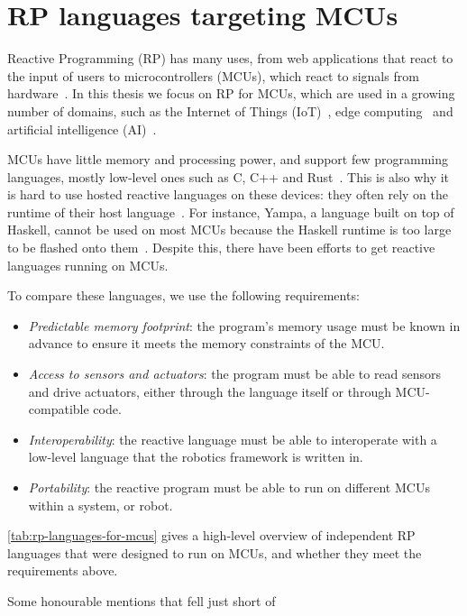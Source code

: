 \documentclass[a4paper]{book}
\begin{document}
\section{RP languages targeting MCUs}
\label{sec:rp-languages-targeting-mcus}
Reactive Programming (RP) has many uses, from web applications that react to the
input of users to microcontrollers (MCUs), which react to signals from
hardware~\cite{surveyRP2024, rpbaremetal2022}. In this thesis we focus on RP for
MCUs, which are used in a growing number of domains, such as the Internet of
Things (IoT)~\cite{gubbi2013internet}, edge computing~\cite{shi2016edge} and
artificial intelligence (AI)~\cite{liu2023space}.
\par
MCUs have little memory and processing power, and support few programming
languages, mostly low-level ones such as C, C++ and Rust~\cite{sharma2024rust}.
This is also why it is hard to use hosted reactive languages on these devices:
they often rely on the runtime of their host language~\cite{surveyRP2024,
oeyen2024virtual}. For instance, Yampa, a language built on top of Haskell,
cannot be used on most MCUs because the Haskell runtime is too large to be
flashed onto them~\cite{sawada2016emfrp}. Despite this, there have been efforts
to get reactive languages running on MCUs.
\par
To compare these languages, we use the following requirements:
\begin{itemize}
    \item \emph{Predictable memory footprint}: the program's memory usage must
        be known in advance to ensure it meets the memory constraints of the
        MCU.
    \item \emph{Access to sensors and actuators}: the program must be able to
        read sensors and drive actuators, either through the language itself or
        through MCU-compatible code.
    \item \emph{Interoperability}: the reactive language must be able to
        interoperate with a low-level language that the robotics framework is
        written in.
    \item \emph{Portability}: the reactive program must be able to run on
        different MCUs within a system, or robot.
\end{itemize}
\cref{tab:rp-languages-for-mcus} gives a high-level overview of independent RP
languages that were designed to run on MCUs, and whether they meet the
requirements above.
\par
Some honourable mentions that fell just short of
\end{document}
